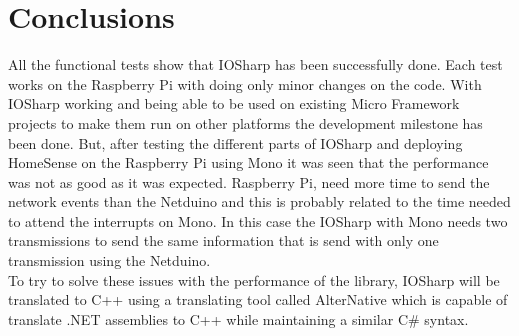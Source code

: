 \section{Conclusions}\label{S:Results-overview}
All the functional tests show that IOSharp has been successfully done. Each test works on the Raspberry Pi with doing only minor changes on the code. With IOSharp working and being able to be used on existing Micro Framework projects to make them run on other platforms the development milestone has been done. But, after testing the different parts of IOSharp and deploying HomeSense on the Raspberry Pi using Mono it was seen that the performance was not as good as it was expected. Raspberry Pi, need more time to send the network events than the Netduino and this is probably related to the time needed to attend the interrupts on Mono. In this case the IOSharp with Mono needs two transmissions to send the same information that is send with only one transmission using the Netduino.
\\
To try to solve these issues with the performance of the library, IOSharp will be translated to C++ using a translating tool called AlterNative which is capable of translate .NET assemblies to C++ while maintaining a similar C\# syntax.